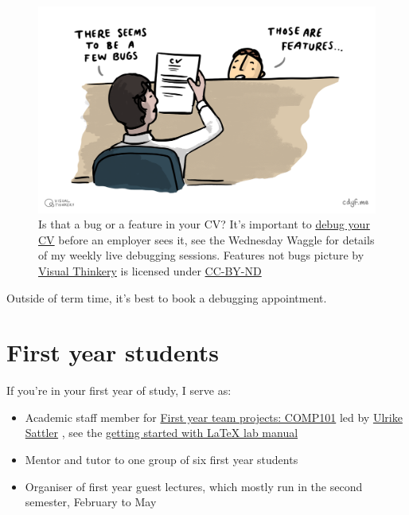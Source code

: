 \documentclass[
  12pt,
]{book}
\providecommand{\tightlist}{%
  \setlength{\itemsep}{0pt}\setlength{\parskip}{0pt}}
\begin{document}
\begin{figure}

{\centering \includegraphics[width=1\linewidth]{images/Features not bugs} 

}

\caption{Is that a bug or a feature in your CV? It's important to \href{https://www.cdyf.me/debugging}{debug your CV} before an employer sees it, see the Wednesday Waggle for details of my weekly live debugging sessions. Features not bugs picture by \href{https://visualthinkery.com}{Visual Thinkery} is licensed under \href{https://creativecommons.org/licenses/by-nd/4.0/}{CC-BY-ND}}\label{fig:bugfeature-fig}
\end{figure}



Outside of term time, it's best to book a debugging appointment. 🐛

\hypertarget{year1}{%
\section{First year students}\label{year1}}

If you're in your first year of study, I serve as:

\begin{itemize}
\tightlist
\item
  Academic staff member for \href{https://studentnet.cs.manchester.ac.uk/ugt/COMP10120/syllabus/}{First year team projects: COMP101} led by \href{http://www.cs.man.ac.uk/~sattler/}{Ulrike Sattler} \citep{COMP10120}, see the \href{http://latex4year1.netlify.app}{getting started with LaTeX lab manual}
\item
  Mentor and tutor to one group of six first year students
\item
  Organiser of first year guest lectures, which mostly run in the second semester, February to May
\end{itemize}
\end{document}
